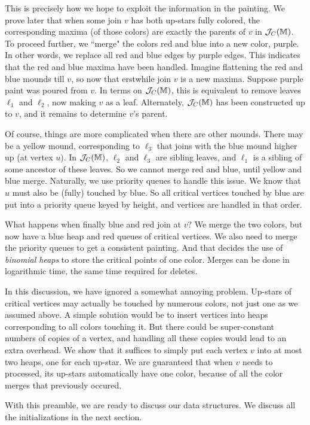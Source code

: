 \documentclass[11pt]{article}
\theoremstyle{definition}
\newcommand{\cJ}{{\cal J}}
\newcommand{\MM}{\mathbb{M}}
\newcommand{\jc}{\cJ_C}
\begin{document}
This is precisely how we hope to exploit the information in the painting. We prove later that
when some join $v$ has both up-stars fully colored, the corresponding maxima (of those colors) are exactly
the parents of $v$ in $\jc(\MM)$. To proceed further, we ``merge" the colors red and blue into a new color, purple. In other words,
we replace all red and blue edges by purple edges. This indicates that the red and blue maxima have been
handled. Imagine flattening the red and blue mounds till $v$, so now that erstwhile join $v$
is a new maxima. Suppose purple paint was poured from $v$. In terms on $\jc(\MM)$, this
is equivalent to remove leaves $\ell_1$ and $\ell_2$, now making $v$ as a leaf.
Alternately, $\jc(\MM)$ has been constructed up to $v$, and it remains to determine $v$'s parent.

Of course, things are more complicated when there are other mounds. There may be a yellow mound,
corresponding to $\ell_3$ that joins with the blue mound higher up (at vertex $u$). In $\jc(\MM)$, $\ell_2$ and $\ell_3$
are sibling leaves, and $\ell_1$ is a sibling of some ancestor of these leaves. So we cannot
merge red and blue, until yellow and blue merge. Naturally, we use priority queues to handle this issue.
We know that $u$ must also be (fully) touched by blue. So all critical vertices touched by blue
are put into a priority queue keyed by height, and vertices are handled in that order.

What happens when finally blue and red join at $v$? We merge the two colors, but now have
a blue heap and red queues of critical vertices. We also need to merge the priority queues
to get a consistent painting. And that decides the use of \emph{binomial heaps} to store the
critical points of one color. Merges can be done in logarithmic time, the same time
required for deletes.

In this discussion, we have ignored a somewhat annoying problem. Up-stars of critical vertices
may actually be touched by numerous colors, not just one as we assumed above. A simple solution
would be to insert vertices into heaps corresponding to all colors touching it. But there could
be super-constant numbers of copies of a vertex, and handling all these copies would lead
to an extra overhead. We show that it suffices to simply put each vertex $v$ into at most two heaps,
one for each up-star. We are guaranteed that when $v$ needs to processed, its up-stars
automatically have one color, because of all the color merges that previously occured.

With this preamble, we are ready to discuss our data structures. We discuss all the initializations
in the next section.
\end{document}

